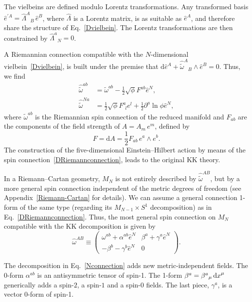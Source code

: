 \documentclass[aps,prd,12pt,superscriptaddress,showpacs,showkeys,longbibliography,reprint,nofootinbib]{revtex4-1}
\begin{document}
The vielbeins are defined modulo Lorentz transformations. Any transformed basis $\hat{e}^{\prime A} = \hat{\Lambda}^A{}_{B}\,\hat{e}^B$,
where $\hat{\Lambda}$ is a Lorentz matrix, is as suitable as $\hat{e}^A$, and therefore share the structure of Eq.~\eqref{Dvielbein}. The Lorentz transformations are then constrained by $\hat{\Lambda}^a{}_{N}=0$.

A Riemannian connection compatible with the \mbox{$N$-dimensional} vielbein~\eqref{Dvielbein}, is built under the premise that $\mbox{d}\hat{e}^A + \hat{\tilde{\omega}}^{A}{}_B \wedge \hat{e}^B = 0$. Thus, we find
\begin{equation}
  \label{DRiemannconnection}
  \begin{split}
    \hat{\tilde{\omega}}^{ab}&=\tilde{\omega}^{ab}-\frac{1}{2}\sqrt{\phi}F^{ab}\hat{e}^N,\\
    \hat{\tilde{\omega}}^{Na}&=\frac{1}{2}\sqrt{\phi}F^a_{\ \ l}e^l+\frac{1}{2}\partial^a\ln\phi\hat{e}^N,
  \end{split}
\end{equation}
where $\tilde{\omega}^{ab}$ is the Riemannian spin connection of the reduced manifold and $F_{ab}$ are the components of the field strength of $A = A_m\, e^m$, defined by
\begin{equation}
  F=\text{d}A=\frac{1}{2}F_{ab}\, e^a\wedge e^b.
\end{equation}
The construction of the five-dimensional Einstein--Hilbert action by means of the spin connection~\eqref{DRiemannconnection}, leads to the original KK theory.

In a Riemann--Cartan geometry, $M_N$ is not entirely described by $\hat{\tilde{\omega}}^{AB}$, but by a more general spin connection independent of the metric degrees of freedom (see Appendix~\ref{Riemann-Cartan} for details). We can assume a general connection 1-form of the same type (regarding its $M_{N-1}\times S^1$ decomposition) as in Eq.~\eqref{DRiemannconnection}. Thus, the most general spin connection on $M_N$ compatible with the KK decomposition is given by 
\begin{equation}\label{Nconnection}
  \hat{\omega}^{AB} \equiv
  \begin{pmatrix}
    \omega^{ab}+\alpha^{ab}\hat{e}^N & \beta^a+\gamma^a\hat{e}^N\\
    -\beta^b-\gamma^b\hat{e}^N & 0
  \end{pmatrix}.
\end{equation}

The decomposition in Eq.~\eqref{Nconnection} adds new metric-independent fields. The 0-form $\alpha^{ab}$ is an antisymmetric tensor of spin-1. The 1-form $\beta^a = \beta^a{}_\mu \mathop{\mathrm{d}x}\nolimits^\mu$ generically adds a spin-$2$, a spin-$1$ and a spin-$0$ fields. The last piece, $\gamma^a$, is a vector $0$-form of spin-1.
\end{document}
